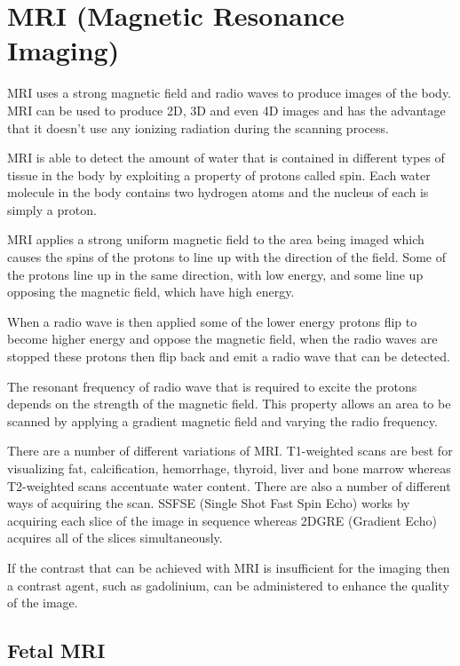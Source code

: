 \section{MRI (Magnetic Resonance Imaging)}\label{background:mri}\cite{howmriworks}

MRI uses a strong magnetic field and radio waves to produce images of the body. MRI can be used to produce 2D, 3D and even 4D images and has the advantage that it doesn’t use any ionizing radiation during the scanning process.

MRI is able to detect the amount of water that is contained in different types of tissue in the body by exploiting a property of protons called spin. Each water molecule in the body contains two hydrogen atoms and the nucleus of each is simply a proton.

MRI applies a strong uniform magnetic field to the area being imaged which causes the spins of the protons to line up with the direction of the field. Some of the protons line up in the same direction, with low energy, and some line up opposing the magnetic field, which have high energy.

When a radio wave is then applied some of the lower energy protons flip to become higher energy and oppose the magnetic field, when the radio waves are stopped these protons then flip back and emit a radio wave that can be detected.

The resonant frequency of radio wave that is required to excite the protons depends on the strength of the magnetic field. This property allows an area to be scanned by applying a gradient magnetic field and varying the radio frequency.

There are a number of different variations of MRI. T1-weighted scans are best for visualizing fat, calcification, hemorrhage, thyroid, liver and bone marrow whereas T2-weighted scans accentuate water content.
There are also a number of different ways of acquiring the scan. SSFSE (Single Shot Fast Spin Echo) works by acquiring each slice of the image in sequence whereas 2DGRE (Gradient Echo) acquires all of the slices simultaneously.

If the contrast that can be achieved with MRI is insufficient for the imaging then a contrast agent, such as gadolinium, can be administered to enhance the quality of the image.

\subsection{Fetal MRI}\label{background:fetalmri}\cite{fetalmri}

